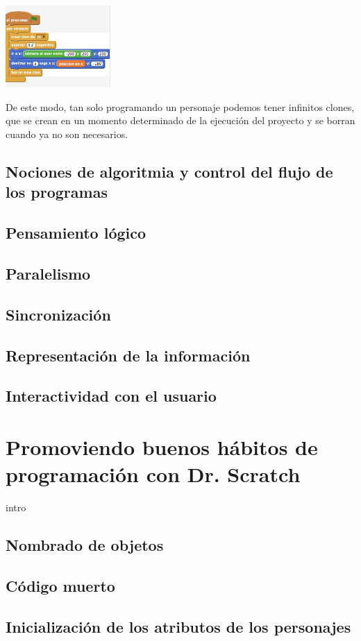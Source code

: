 \documentclass[a4paper,10pt]{article}
\begin{document}
\includegraphics[width=4cm]{img/abs6.jpg}

De este modo, tan solo programando un personaje podemos tener infinitos clones, que se crean en un momento determinado de la ejecución del proyecto y se borran cuando ya no son necesarios.
\subsection{Nociones de algoritmia y control del flujo de los programas}
\subsection{Pensamiento lógico}
\subsection{Paralelismo}
\subsection{Sincronización}
\subsection{Representación de la información}
\subsection{Interactividad con el usuario}

\section{Promoviendo buenos hábitos de programación con Dr. Scratch}
intro
\subsection{Nombrado de objetos}
\subsection{Código muerto}
\subsection{Inicialización de los atributos de los personajes}
\end{document}
